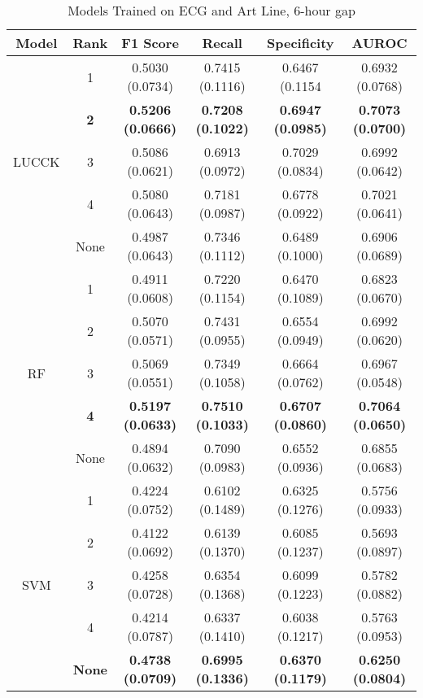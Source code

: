 \begin{table}
    \centering
    \caption{Models Trained on ECG and Art Line, 6-hour gap}
    \begin{tabularx}{\textwidth}{|C|C|C|C|C|C|}
        \hline
        Model & Rank & F1 Score & Recall & Specificity & AUROC \\
        \hline
         & 1 & 0.5030 (0.0734) & 0.7415 (0.1116) & 0.6467 (0.1154 & 0.6932 (0.0768)\\
         & \textbf{2} & \textbf{0.5206 (0.0666)} & \textbf{0.7208 (0.1022)} & \textbf{0.6947 (0.0985)} & \textbf{0.7073 (0.0700)}\\
        LUCCK & 3 & 0.5086 (0.0621) & 0.6913 (0.0972) & 0.7029 (0.0834) & 0.6992 (0.0642)\\
         & 4 & 0.5080 (0.0643) & 0.7181 (0.0987) & 0.6778 (0.0922) & 0.7021 (0.0641)\\
         & None & 0.4987 (0.0643) & 0.7346 (0.1112) & 0.6489 (0.1000) & 0.6906 (0.0689)\\
         \hline
         & 1 & 0.4911 (0.0608) & 0.7220 (0.1154) & 0.6470 (0.1089) & 0.6823 (0.0670)\\
         & 2 & 0.5070 (0.0571) & 0.7431 (0.0955) & 0.6554 (0.0949) & 0.6992 (0.0620)\\
         RF & 3 & 0.5069 (0.0551) & 0.7349 (0.1058) & 0.6664 (0.0762) & 0.6967 (0.0548)\\
         & \textbf{4} & \textbf{0.5197 (0.0633)} & \textbf{0.7510 (0.1033)} & \textbf{0.6707 (0.0860)} & \textbf{0.7064 (0.0650)}\\
         & None & 0.4894 (0.0632) & 0.7090 (0.0983) & 0.6552 (0.0936) & 0.6855 (0.0683)\\
         \hline
         & 1 & 0.4224 (0.0752) & 0.6102 (0.1489) & 0.6325 (0.1276) & 0.5756 (0.0933)\\
         & 2 & 0.4122 (0.0692) & 0.6139 (0.1370) & 0.6085 (0.1237) & 0.5693 (0.0897)\\
         SVM & 3 & 0.4258 (0.0728) & 0.6354 (0.1368) & 0.6099 (0.1223) & 0.5782 (0.0882)\\
         & 4 & 0.4214 (0.0787) & 0.6337 (0.1410) & 0.6038 (0.1217) & 0.5763 (0.0953)\\
         & \textbf{None} & \textbf{0.4738 (0.0709)} & \textbf{0.6995 (0.1336)} & \textbf{0.6370 (0.1179)} & \textbf{0.6250 (0.0804)}\\
         \hline
    \end{tabularx}
\end{table}

